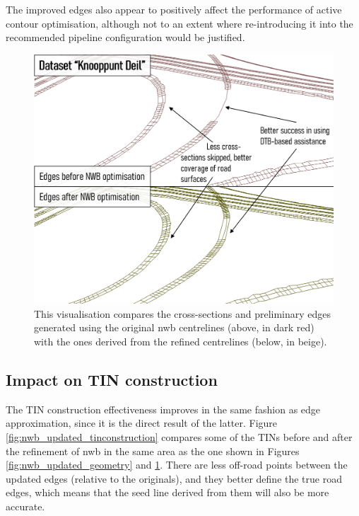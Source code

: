 The improved edges also appear to positively affect the performance of active contour optimisation, although not to an extent where re-introducing it into the recommended pipeline configuration would be justified.

\begin{figure}
    \centering
    \includegraphics[width=\linewidth]{final_report/figs/nwb_updated_edgeapproximation.png}
    \caption[Visualisation of the effects of improving NWB on preliminary edges]{This visualisation compares the cross-sections and preliminary edges generated using the original \ac{nwb} centrelines (above, in dark red) with the ones derived from the refined centrelines (below, in beige).}
    \label{fig:nwb_updated_edgeapproximation}
\end{figure}

\subsection{Impact on TIN construction}
\label{sub:nwb_updated_tinconstruction}

The TIN construction effectiveness improves in the same fashion as edge approximation, since it is the direct result of the latter. Figure \ref{fig:nwb_updated_tinconstruction} compares some of the TINs before and after the refinement of \ac{nwb} in the same area as the one shown in Figures \ref{fig:nwb_updated_geometry} and \ref{fig:nwb_updated_edgeapproximation}. There are less off-road points between the updated edges (relative to the originals), and they better define the true road edges, which means that the seed line derived from them will also be more accurate.

